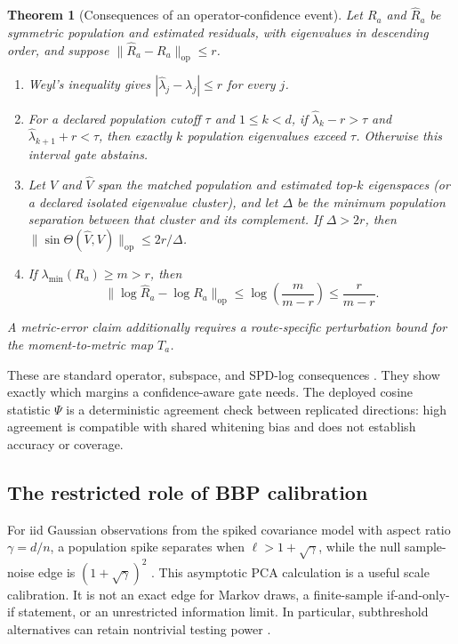 \documentclass[11pt]{article}
\theoremstyle{plain}
\newtheorem{theorem}{Theorem}
\theoremstyle{definition}
\theoremstyle{remark}
\newcommand{\op}{\mathrm{op}}
\begin{document}
\begin{theorem}[Consequences of an operator-confidence event]\label{thm:operator}
Let $R_a$ and $\widehat R_a$ be symmetric population and estimated residuals,
with eigenvalues in descending order, and suppose
$\|\widehat R_a-R_a\|_{\op}\le r$.
\begin{enumerate}
\item Weyl's inequality gives
  $|\widehat\lambda_j-\lambda_j|\le r$ for every $j$.
\item For a declared population cutoff $\tau$ and $1\le k<d$, if
  $\widehat\lambda_k-r>\tau$ and
  $\widehat\lambda_{k+1}+r<\tau$, then exactly $k$ population eigenvalues
  exceed $\tau$. Otherwise this interval gate abstains.
\item Let $V$ and $\widehat V$ span the matched population and estimated top-$k$
  eigenspaces (or a declared isolated eigenvalue cluster), and let $\Delta$ be
  the minimum population separation between that cluster and its complement.
  If $\Delta>2r$, then
  $\|\sin\Theta(\widehat V,V)\|_{\op}\le2r/\Delta$.
\item If $\lambda_{\min}(R_a)\ge m>r$, then
  \[
    \|\log\widehat R_a-\log R_a\|_{\op}
       \le \log\!\left(\frac m{m-r}\right)\le\frac r{m-r}.
  \]
\end{enumerate}
A metric-error claim additionally requires a route-specific perturbation bound
for the moment-to-metric map $T_a$.
\end{theorem}

These are standard operator, subspace, and SPD-log consequences
\citep{bhatia1997matrix,yu2015useful,higham2008functions}. They show exactly
which margins a confidence-aware gate needs. The deployed cosine statistic
$\Psi$ is a deterministic agreement check between replicated directions:
high agreement is compatible with shared whitening bias and does not establish
accuracy or coverage.

\subsection{The restricted role of BBP calibration}

For iid Gaussian observations from the spiked covariance model with aspect
ratio $\gamma=d/n$, a population spike separates when
$\ell>1+\sqrt\gamma$, while the null sample-noise edge is
$(1+\sqrt\gamma)^2$ \citep{baik2005phase,baik2006eigenvalues,paul2007asymptotics}.
This asymptotic PCA calculation is a useful scale calibration. It is not an
exact edge for Markov draws, a finite-sample if-and-only-if statement, or an
unrestricted information limit. In particular, subthreshold alternatives can
retain nontrivial testing power \citep{onatski2013asymptotic}.
\end{document}
